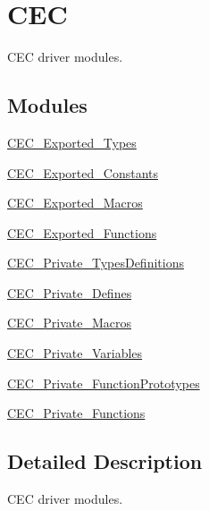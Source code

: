 \hypertarget{group___c_e_c}{}\section{C\+EC}
\label{group___c_e_c}


C\+EC driver modules.  


\subsection*{Modules}
\begin{DoxyCompactItemize}
\item 
\mbox{\hyperlink{group___c_e_c___exported___types}{C\+E\+C\+\_\+\+Exported\+\_\+\+Types}}
\item 
\mbox{\hyperlink{group___c_e_c___exported___constants}{C\+E\+C\+\_\+\+Exported\+\_\+\+Constants}}
\item 
\mbox{\hyperlink{group___c_e_c___exported___macros}{C\+E\+C\+\_\+\+Exported\+\_\+\+Macros}}
\item 
\mbox{\hyperlink{group___c_e_c___exported___functions}{C\+E\+C\+\_\+\+Exported\+\_\+\+Functions}}
\item 
\mbox{\hyperlink{group___c_e_c___private___types_definitions}{C\+E\+C\+\_\+\+Private\+\_\+\+Types\+Definitions}}
\item 
\mbox{\hyperlink{group___c_e_c___private___defines}{C\+E\+C\+\_\+\+Private\+\_\+\+Defines}}
\item 
\mbox{\hyperlink{group___c_e_c___private___macros}{C\+E\+C\+\_\+\+Private\+\_\+\+Macros}}
\item 
\mbox{\hyperlink{group___c_e_c___private___variables}{C\+E\+C\+\_\+\+Private\+\_\+\+Variables}}
\item 
\mbox{\hyperlink{group___c_e_c___private___function_prototypes}{C\+E\+C\+\_\+\+Private\+\_\+\+Function\+Prototypes}}
\item 
\mbox{\hyperlink{group___c_e_c___private___functions}{C\+E\+C\+\_\+\+Private\+\_\+\+Functions}}
\end{DoxyCompactItemize}


\subsection{Detailed Description}
C\+EC driver modules. 

